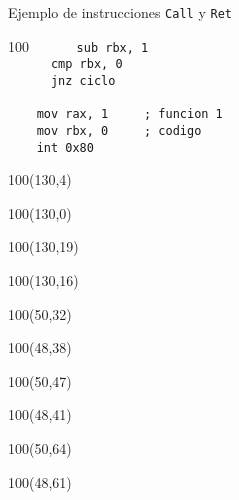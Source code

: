 \documentclass[aspectratio=169]{beamer}
\begin{document}
\begin{frame}[fragile]{Ejemplo de instrucciones \texttt{Call} y \texttt{Ret}}
\begin{textblock}{100}
    \verb|      sub rbx, 1              |\\
    \verb|      cmp rbx, 0              |\\
    \verb|      jnz ciclo               |\\
    \verb|                              |\\
    \verb|    mov rax, 1     ; funcion 1|\\ 
    \verb|    mov rbx, 0     ; codigo   |\\ 
    \verb|    int 0x80                  |\\
    \end{textblock}
    \begin{textblock}{100}(130,4)   \end{textblock}
    \begin{textblock}{100}(130,0)   \end{textblock}
    \begin{textblock}{100}(130,19)  \end{textblock}
    \begin{textblock}{100}(130,16)  \end{textblock}
    \begin{textblock}{100}(50,32)   \end{textblock}
    \begin{textblock}{100}(48,38)   \end{textblock}
    \begin{textblock}{100}(50,47)   \end{textblock}
    \begin{textblock}{100}(48,41)   \end{textblock}
    \begin{textblock}{100}(50,64)   \end{textblock}
    \begin{textblock}{100}(48,61)   \end{textblock}

\end{frame}
\end{document}

